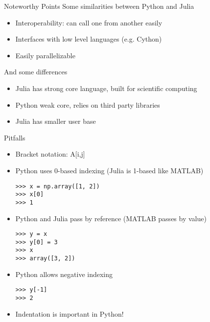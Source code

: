 \documentclass[11pt,t]{beamer}
\begin{document}
\begin{frame}[fragile]{Noteworthy Points}
Some similarities between Python and Julia
	\begin{itemize}
	\item Interoperability: can call one from another easily
	\item Interfaces with low level languages (e.g. Cython)
	\item Easily parallelizable
		\end{itemize}
		\vspace{10mm}
		And some differences
			\begin{itemize}
	\item Julia has strong core language, built for scientific computing
	\item Python weak core, relies on third party libraries
   \item Julia has smaller user base
		\end{itemize}
\end{frame}
\begin{frame}[fragile]{Pitfalls}
	\begin{itemize}
	\item Bracket notation: A[i,j] 
	\item Python uses 0-based indexing (Julia is 1-based like MATLAB)
	\small
	\begin{lstlisting}
>>> x = np.array([1, 2])
>>> x[0] 
>>> 1
\end{lstlisting}
\normalsize
		\item {Python and Julia pass by reference (MATLAB passes by value)}
		\small
\begin{lstlisting}
>>> y = x
>>> y[0] = 3
>>> x 
>>> array([3, 2])
\end{lstlisting}
	\item Python allows negative indexing
		\small
\begin{lstlisting}
>>> y[-1]
>>> 2
\end{lstlisting}	
\normalsize
\item Indentation is important in Python!
		\end{itemize}
\end{frame}
\end{document}
